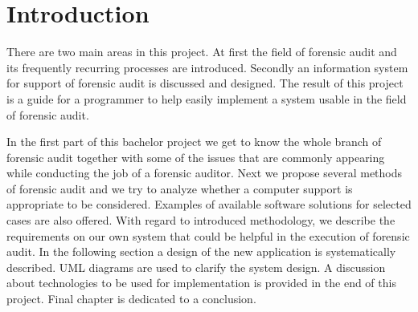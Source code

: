 \chapter*{Introduction} \label{Introduction}



%




There are two main areas in this project. At first the field of forensic audit and its frequently recurring processes are introduced. Secondly an information system for support of forensic audit is discussed and designed. The result of this project is a guide for a programmer to help easily implement a system usable in the field of forensic audit.


In the first part of this bachelor project we get to know the whole branch of forensic audit together with some of the issues that are commonly appearing while conducting the job of a forensic auditor. Next we propose several methods of forensic audit and we try to analyze whether a computer support is appropriate to be considered. Examples of available software solutions for selected cases are also offered. With regard to introduced methodology, we describe the requirements on our own system that could be helpful in the execution of forensic audit. In the following section a design of the new application is systematically described. UML diagrams are used to clarify the system design. A discussion about technologies to be used for implementation is provided in the end of this project. Final chapter is dedicated to a conclusion. 



\sediva{ \blindtext}
\sediva{ \blindtext}





















